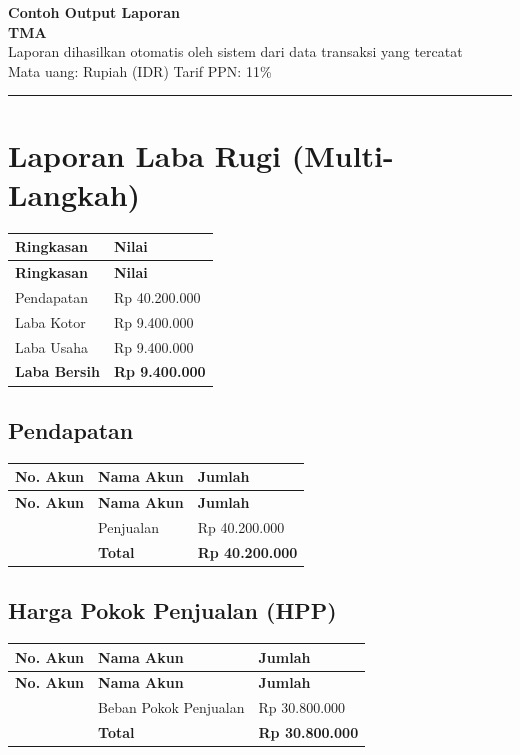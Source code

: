 \documentclass[11pt,a4paper]{article}
\begin{document}
\begin{center}
{\color{navy}\Huge\bfseries Contoh Output Laporan}\\[4pt]
{\Large\bfseries TMA}\\[6pt]
{\color{grey} Laporan dihasilkan otomatis oleh sistem dari data transaksi yang tercatat}\\[2pt]
{\color{grey} Mata uang: Rupiah (IDR) \quad\textbullet\quad Tarif PPN: 11\%}\\[10pt]
\color{accent}\rule{\linewidth}{1.2pt}
\end{center}
\vspace{4pt}
\tableofcontents
\newpage
\section{Laporan Laba Rugi (Multi-Langkah)}
{\setlength{\tabcolsep}{5pt}
\begin{longtable}{l R{3cm}}
\toprule
\textbf{Ringkasan} & \textbf{Nilai} \\
\midrule\endfirsthead
\toprule
\textbf{Ringkasan} & \textbf{Nilai} \\
\midrule\endhead
\bottomrule\endfoot
Pendapatan & Rp 40.200.000 \\
Laba Kotor & Rp 9.400.000 \\
Laba Usaha & Rp 9.400.000 \\
\textbf{Laba Bersih} & \textbf{Rp 9.400.000} \\
\end{longtable}}

\subsection{Pendapatan}
{\setlength{\tabcolsep}{5pt}
\begin{longtable}{l l R{3cm}}
\toprule
\textbf{No. Akun} & \textbf{Nama Akun} & \textbf{Jumlah} \\
\midrule\endfirsthead
\toprule
\textbf{No. Akun} & \textbf{Nama Akun} & \textbf{Jumlah} \\
\midrule\endhead
\bottomrule{} & Penjualan & Rp 40.200.000 \\
 & \textbf{Total} & \textbf{Rp 40.200.000} \\
\end{longtable}}

\subsection{Harga Pokok Penjualan (HPP)}
{\setlength{\tabcolsep}{5pt}
\begin{longtable}{l l R{3cm}}
\toprule
\textbf{No. Akun} & \textbf{Nama Akun} & \textbf{Jumlah} \\
\midrule\endfirsthead
\toprule
\textbf{No. Akun} & \textbf{Nama Akun} & \textbf{Jumlah} \\
\midrule\endhead
\bottomrule{} & Beban Pokok Penjualan & Rp 30.800.000 \\
 & \textbf{Total} & \textbf{Rp 30.800.000} \\
\end{longtable}}
\end{document}
